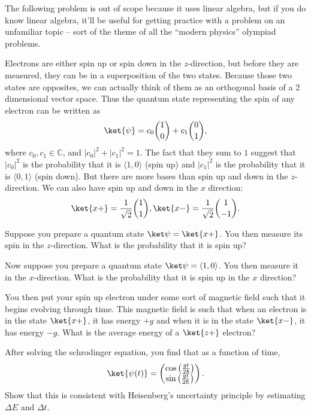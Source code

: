 \documentclass[11pt]{scrartcl}
\begin{document}
The following problem is out of scope because it uses linear algebra, but if you do know linear algebra, it'll be useful for getting practice with a problem on an unfamiliar topic -- sort of the theme of all the ``modern physics'' olympiad problems.

\begin{prob}
    Electrons are either spin up or spin down in the $z$-direction, but before they are measured, they can be in a superposition of the two states. Because those two states are opposites, we can actually think of them as an orthogonal basis of a 2 dimensional vector space. Thus the quantum state representing the spin of any electron can be written as
    $$\ket{\psi} = c_0 \binom 10 + c_1 \binom 01,$$
    where $c_0,c_1 \in \mathbb C$, and $|c_0|^2 + |c_1|^2 = 1$. The fact that they sum to $1$ suggest that $|c_0|^2$ is the probability that it is $\langle 1,0\rangle$ (spin up) and $|c_1|^2$ is the probability that it is $\langle 0,1\rangle$ (spin down). But there are more bases than spin up and down in the $z$-direction. We can also have spin up and down in the $x$ direction:
    $$\ket{x+} = \frac{1}{\sqrt{2}}\binom 11, \ket{x-} = \frac{1}{\sqrt{2}} \binom{1}{-1}.$$
    \begin{anum}
        \item Suppose you prepare a quantum state $\ket \psi = \ket{x+}$. You then measure its spin in the $z$-direction. What is the probability that it is spin up?
        \item Now suppose you prepare a quantum state $\ket \psi = \langle 1,0\rangle$. You then measure it in the $x$-direction. What is the probability that it is spin up in the $x$ direction?
        \item You then put your spin up electron under some sort of magnetic field such that it begins evolving through time. This magnetic field is such that when an electron is in the state $\ket{x+}$, it has energy $+g$ and when it is in the state $\ket{x-}$, it has energy $-g$. What is the average energy of a $\ket{z+}$ electron?
        \item After solving the schrodinger equation, you find that as a function of time,
        $$\ket{\psi(t)} = \begin{pmatrix}\cos \left(\frac{gt}{2\hbar}\right) \\ \sin \left(\frac{gt}{2\hbar}\right)\end{pmatrix}.$$
        Show that this is consistent with Heisenberg's uncertainty principle by estimating $\Delta E$ and $\Delta t$.
    \end{anum}
\end{prob}
\end{document}
